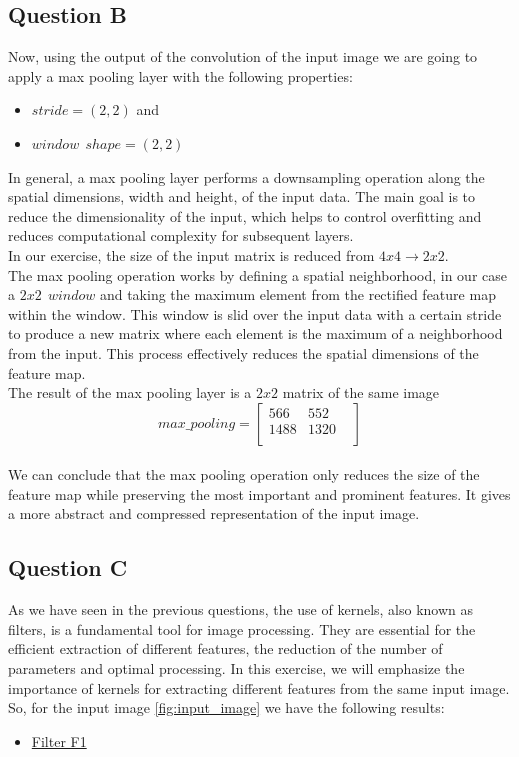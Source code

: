 \subsection{Question B}
Now, using the output of the convolution of the input image we are going to apply a max pooling layer with the following properties: 
\begin{itemize}
	\item $stride = \left(2,2\right)$ and 
	\item $	window\ \ shape = \left(2, 2\right)$
\end{itemize}
In general, a max pooling layer performs a downsampling operation along the spatial dimensions, width and height, of the input data. The main goal is to reduce the dimensionality of the input, which helps to control overfitting and reduces computational complexity for subsequent layers.\\
In our exercise, the size of the input matrix is reduced from $ 4 x 4 \rightarrow 2 x 2$.\\
 
The max pooling operation works by defining a spatial neighborhood, in our case a $ 2 x 2\ \ window$ and taking the maximum element from the rectified feature map within the window. This window is slid over the input data with a certain stride to produce a new matrix where each element is the maximum of a neighborhood from the input. This process effectively reduces the spatial dimensions of the feature map.\\

The result of the max pooling layer is a $2 x 2$ matrix of the same image
\begin{equation}
	max\_pooling = \begin{bmatrix}
		566 & 552   \\
		1488 & 1320 &  \\
	\end{bmatrix}
\end{equation}
\\
We can conclude that the max pooling operation only reduces the size of the feature map while preserving the most important and prominent features. It gives a more abstract and compressed representation of the input image.
\vspace{3mm}

\subsection{Question C}
As we have seen in the previous questions, the use of kernels, also known as filters, is a fundamental tool for image processing. They are essential for the efficient extraction of different features, the reduction of the number of parameters and optimal processing. In this exercise, we will emphasize the importance of kernels for extracting different features from the same input image.\\

So, for the input image \ref{fig:input_image} we have the following results:
\begin{itemize}
	\item \underline{Filter F1}\\
	
\end{itemize}





